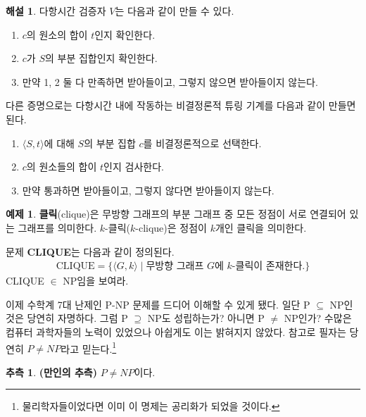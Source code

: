 \documentclass[b5paper, 11pt]{book}
\theoremstyle{definition}
\newtheorem{ex}[defn]{예제}
\newtheorem{conj}[defn]{추측}
\newtheorem*{ans*}{해설}
\begin{document}
\begin{ans*}
    다항시간 검증자 $V$는 다음과 같이 만들 수 있다.
    \begin{enumerate}
        \item $c$의 원소의 합이 $t$인지 확인한다.
        \item $c$가 $S$의 부분 집합인지 확인한다.
        \item 만약 1, 2 둘 다 만족하면 받아들이고, 그렇지 않으면 받아들이지 않는다.
    \end{enumerate}
    다른 증명으로는 다항시간 내에 작동하는 비결정론적 튜링 기계를 다음과 같이 만들면 된다.
    \begin{enumerate}
        \item $\langle S, t \rangle$에 대해 $S$의 부분 집합 $c$를 비결정론적으로 선택한다.
        \item $c$의 원소들의 합이 $t$인지 검사한다.
        \item 만약 통과하면 받아들이고, 그렇지 않다면 받아들이지 않는다. 
    \end{enumerate}
\end{ans*}
\begin{ex}
    \textbf{클릭}(clique)은 무방향 그래프의 부분 그래프 중 모든 정점이 서로 연결되어 있는 그래프를 의미한다.
    $k$-클릭($k$-clique)은 정점이 $k$개인 클릭을 의미한다.
\begin{figure}[!ht]
    \centering
    \caption{}
\end{figure}
문제 \textbf{CLIQUE}는 다음과 같이 정의된다.
\begin{align*}
    \text{CLIQUE} = \{ \langle G , k \rangle \;\vert\; \text{무방향 그래프 } 
    G\text{에 }k\text{-클릭이 존재한다.}\}
\end{align*}
CLIQUE $\in$ NP임을 보여라.
\end{ex}
이제 수학계 7대 난제인 P-NP 문제를 드디어 이해할 수 있게 됐다. 일단 P $\subseteq$ NP인 것은 당연히 자명하다. 그럼 P $\supseteq$ NP도 성립하는가? 아니면 P $\neq$ NP인가? 수많은 컴퓨터 과학자들의 노력이 있었으나 아쉽게도 이는 밝혀지지 않았다. 참고로 필자는 당연히 $P \neq NP$라고 믿는다.\footnote{물리학자들이었다면 이미 이 명제는 공리화가 되었을 것이다.}
\begin{conj}
    \textbf{(만인의 추측)} $P \neq NP$이다.
\end{conj} 
\end{document}
